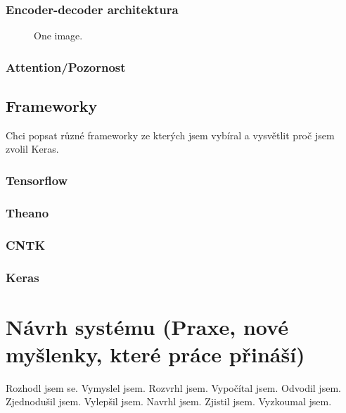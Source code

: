 \subsection{Encoder-decoder architektura}
\begin{figure}
    \begin{center}
    \end{center}
	\caption{One image. }
	\label{img:TODO}
\end{figure}
\subsection{Attention/Pozornost}




\section{Frameworky}
Chci popsat různé frameworky ze kterých jsem vybíral a vysvětlit proč jsem zvolil Keras.
\subsection{Tensorflow}
\subsection{Theano}
\subsection{CNTK}
\subsection{Keras}

\chapter{Návrh systému (Praxe, nové myšlenky, které práce přináší)}
Rozhodl jsem se.
Vymyslel jsem.
Rozvrhl jsem.
Vypočítal jsem.
Odvodil jsem.
Zjednodušil jsem.
Vylepšil jsem.
Navrhl jsem.
Zjistil jsem.
Vyzkoumal jsem.

